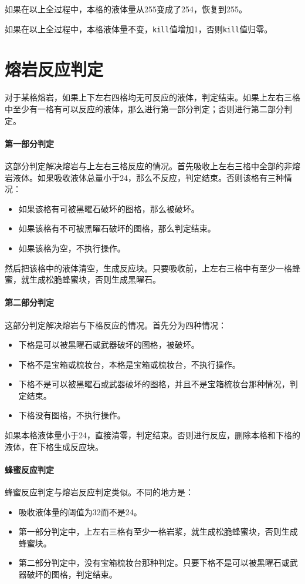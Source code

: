 {如果在以上全过程中，本格的液体量从255变成了254，恢复到255。

如果在以上全过程中，本格液体量不变，\lstinline{kill}值增加1，否则\lstinline{kill}值归零。

\section{熔岩反应判定}\label{app24}
对于某格熔岩，如果上下左右四格均无可反应的液体，判定结束。如果上左右三格中至少有一格有可以反应的液体，那么进行第一部分判定；否则进行第二部分判定。

\paragraph*{第一部分判定}
这部分判定解决熔岩与上左右三格反应的情况。首先吸收上左右三格中全部的非熔岩液体。如果吸收液体总量小于24，那么不反应，判定结束。否则该格有三种情况：
\begin{itemize}
    \item 如果该格有可被黑曜石破坏的图格，那么被破坏。
    \item 如果该格有不可被黑曜石破坏的图格，那么判定结束。
    \item 如果该格为空，不执行操作。
\end{itemize}
然后把该格中的液体清空，生成反应块。只要吸收前，上左右三格中有至少一格蜂蜜，就生成松脆蜂蜜块，否则生成黑曜石。

\paragraph*{第二部分判定}
这部分判定解决熔岩与下格反应的情况。首先分为四种情况：
\begin{itemize}
    \item 下格是可以被黑曜石或武器破坏的图格，被破坏。
    \item 下格不是宝箱或梳妆台，本格是宝箱或梳妆台，不执行操作。
    \item 下格不是可以被黑曜石或武器破坏的图格，并且不是宝箱梳妆台那种情况，判定结束。
    \item 下格没有图格，不执行操作。
\end{itemize}
如果本格液体量小于24，直接清零，判定结束。否则进行反应，删除本格和下格的液体，在下格生成反应块。

\paragraph*{蜂蜜反应判定}\label{app25}
蜂蜜反应判定与熔岩反应判定类似。不同的地方是：
\begin{itemize}
    \item 吸收液体量的阈值为32而不是24。
    \item 第一部分判定中，上左右三格有至少一格岩浆，就生成松脆蜂蜜块，否则生成蜂蜜块。
    \item 第二部分判定中，没有宝箱梳妆台那种判定。只要下格不是可以被黑曜石或武器破坏的图格，判定结束。
\end{itemize}

}
